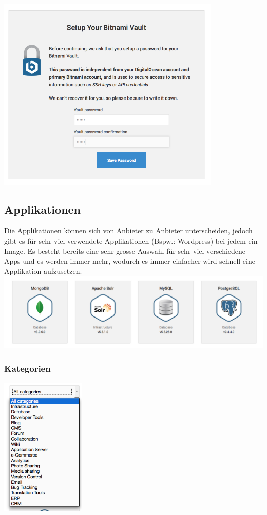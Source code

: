 \includegraphics[width=0.8\textwidth]{./03_Analyse/03_Bitnami/images/bitnami_security}

\subsection{Applikationen}
Die Applikationen können sich von Anbieter zu Anbieter unterscheiden, jedoch 
gibt es für sehr viel verwendete Applikationen (Bspw.: Wordpress) bei jedem ein 
Image.
Es besteht bereits eine sehr grosse Auswahl für sehr viel verschiedene Apps und 
es werden immer mehr, wodurch es immer einfacher wird schnell eine Applikation 
aufzusetzen.
\includegraphics[width=\textwidth]{./03_Analyse/03_Bitnami/images/apps}

\subsubsection{Kategorien}
\includegraphics[width=0.3\textwidth]{./03_Analyse/03_Bitnami/images/categories}

